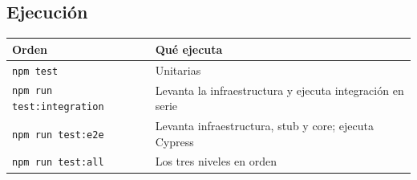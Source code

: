 \documentclass[11pt,a4paper]{report}
\begin{document}
\subsection{Ejecución}
\begin{center}
\begin{tabular}{@{}ll@{}}
\toprule
Orden & Qué ejecuta \\
\midrule
\texttt{npm test} & Unitarias \\
\texttt{npm run test:integration} & Levanta la infraestructura y ejecuta integración en serie \\
\texttt{npm run test:e2e} & Levanta infraestructura, stub y core; ejecuta Cypress \\
\texttt{npm run test:all} & Los tres niveles en orden \\
\bottomrule
\end{tabular}
\end{center}
\end{document}
